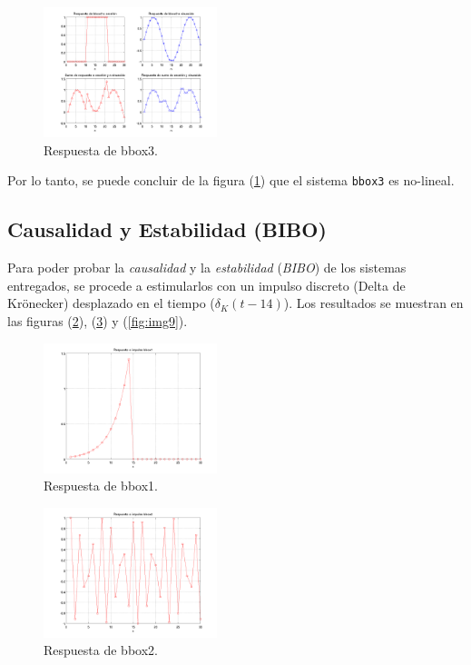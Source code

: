 \documentclass[10pt,conference,a4paper]{IEEEtran}
\begin{document}
\begin{figure}[H]
  \centering
  \includegraphics[width=0.45\textwidth]{../img/img6.png}
  \caption{Respuesta de bbox3.}
  \label{fig:img6}
\end{figure}

Por lo tanto, se puede concluir de la figura (\ref{fig:img6}) que el sistema 
\verb|bbox3| es no-lineal.

\subsection{Causalidad y Estabilidad (BIBO)}

Para poder probar la \emph{causalidad} y la \emph{estabilidad} (\emph{BIBO})
de los sistemas entregados, se procede a estimularlos con un impulso discreto 
(Delta de Kr\"onecker) desplazado en el tiempo ($\delta_K(t-14)$). Los 
resultados se muestran en las figuras (\ref{fig:img7}), (\ref{fig:img8}) y 
(\ref{fig:img9}).

\begin{figure}[H]
  \centering
  \includegraphics[width=0.45\textwidth]{../img/img7.png}
  \caption{Respuesta de bbox1.}
  \label{fig:img7}
\end{figure}

\begin{figure}[H]
  \centering
  \includegraphics[width=0.45\textwidth]{../img/img8.png}
  \caption{Respuesta de bbox2.}
  \label{fig:img8}
\end{figure}
\end{document}
